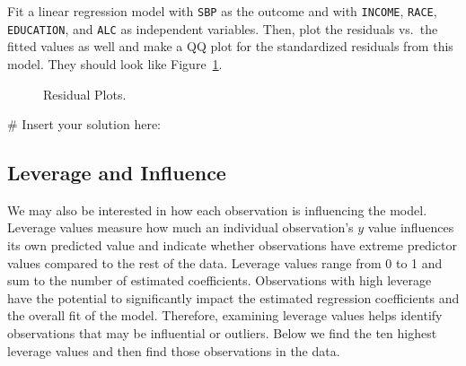 \documentclass[
  letterpaper,
]{krantz}
\makeatletter
\newenvironment{Shaded}{\begin{snugshade}}{\end{snugshade}}
\newcommand{\CommentTok}[1]{\textcolor[rgb]{0.37,0.37,0.37}{#1}}
\newenvironment{kframe}{%
\medskip{}
\setlength{\fboxsep}{.8em}
 \def\at@end@of@kframe{}%
 \ifinner\ifhmode%
  \def\at@end@of@kframe{\end{minipage}}%
  \begin{minipage}{\columnwidth}%
 \fi\fi%
 \def\FrameCommand##1{\hskip\@totalleftmargin \hskip-\fboxsep
 \colorbox{shadecolor}{##1}\hskip-\fboxsep
     \hskip-\linewidth \hskip-\@totalleftmargin \hskip\columnwidth}%
 \MakeFramed {\advance\hsize-\width
   \@totalleftmargin\z@ \linewidth\hsize
   \@setminipage}}%
 {\par\unskip\endMakeFramed%
 \at@end@of@kframe}
\renewenvironment{Shaded}{\begin{kframe}}{\end{kframe}}
\makeatother
\begin{document}
Fit a linear regression model with \texttt{SBP} as the outcome and with
\texttt{INCOME}, \texttt{RACE}, \texttt{EDUCATION}, and \texttt{ALC} as
independent variables. Then, plot the residuals vs.~the fitted values as
well and make a QQ plot for the standardized residuals from this model.
They should look like Figure~\ref{fig-residual-plots}.

\begin{figure}


\caption{\label{fig-residual-plots}Residual Plots.}

\end{figure}%

\begin{Shaded}
\begin{Highlighting}[]
\CommentTok{\# Insert your solution here: }
\end{Highlighting}
\end{Shaded}

\subsection{Leverage and Influence}\label{leverage-and-influence}

We may also be interested in how each observation is influencing the
model. Leverage values measure how much an individual observation's
\(y\) value influences its own predicted value and indicate whether
observations have extreme predictor values compared to the rest of the
data. Leverage values range from 0 to 1 and sum to the number of
estimated coefficients. Observations with high leverage have the
potential to significantly impact the estimated regression coefficients
and the overall fit of the model. Therefore, examining leverage values
helps identify observations that may be influential or outliers. Below
we find the ten highest leverage values and then find those observations
in the data.
\end{document}

